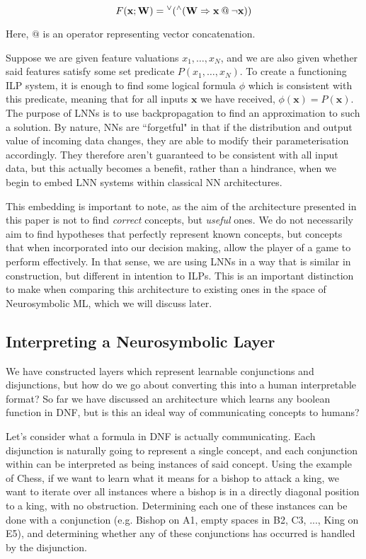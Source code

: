 $$F(\mathbf{x; W}) = {^\lor}({^\land}(\mathbf{W \Rightarrow x {\mspace{4mu}@\mspace{4mu}} \neg x}))$$

Here, $@$ is an operator representing vector concatenation.

Suppose we are given feature valuations $x_1, \dots, x_N$, and we are also given whether said features satisfy some set predicate $P(x_1, \dots, x_N)$. To create a functioning ILP system, it is enough to find some logical formula $\phi$ which is consistent with this predicate, meaning that for all inputs $\mathbf{x}$ we have received, $\phi(\mathbf{x}) = P(\mathbf{x})$. The purpose of LNNs is to use backpropagation to find an approximation to such a solution. By nature, NNs are ``forgetful" in that if the distribution and output value of incoming data changes, they are able to modify their parameterisation accordingly. They therefore aren't guaranteed to be consistent with all input data, but this actually becomes a benefit, rather than a hindrance, when we begin to embed LNN systems within classical NN architectures. 

This embedding is important to note, as the aim of the architecture presented in this paper is not to find \textit{correct} concepts, but \textit{useful} ones. We do not necessarily aim to find hypotheses that perfectly represent known concepts, but concepts that when incorporated into our decision making, allow the player of a game to perform effectively. In that sense, we are using LNNs in a way that is similar in construction, but different in intention to ILPs. This is an important distinction to make when comparing this architecture to existing ones in the space of Neurosymbolic ML, which we will discuss later.

\subsection{Interpreting a Neurosymbolic Layer}

We have constructed layers which represent learnable conjunctions and disjunctions, but how do we go about converting this into a human interpretable format? So far we have discussed an architecture which learns any boolean function in DNF, but is this an ideal way of communicating concepts to humans?

Let's consider what a formula in DNF is actually communicating. Each disjunction is naturally going to represent a single concept, and each conjunction within can be interpreted as being instances of said concept. Using the example of Chess, if we want to learn what it means for a bishop to attack a king, we want to iterate over all instances where a bishop is in a directly diagonal position to a king, with no obstruction. Determining each one of these instances can be done with a conjunction (e.g. Bishop on A1, empty spaces in B2, C3, ..., King on E5), and determining whether any of these conjunctions has occurred is handled by the disjunction. 

